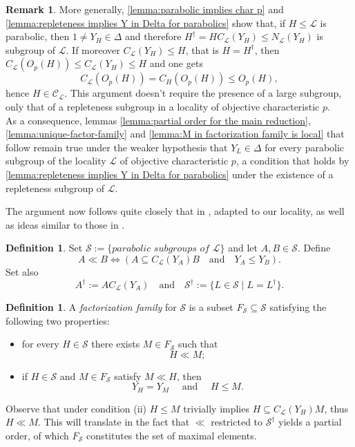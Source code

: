 \documentclass{amsart}
\numberwithin{equation}{section}
\theoremstyle{definition}
\newtheorem{definition}[equation]{Definition}
\newtheorem{remark}[equation]{Remark}
\theoremstyle{subresult}
\theoremstyle{caseresult}
\renewcommand{\L}{\mathcal{L}}
\renewcommand{\S}{\mathcal{S}}
\newcommand{\C}{\mathcal{C}}
\newcommand{\<}{\langle}
\renewcommand{\>}{\rangle}
\begin{document}
\begin{remark}
    More generally, \ref{lemma:parabolic implies char p} and \ref{lemma:repleteness implies Y in Delta for parabolics} show that, if $H \le \L$ is parabolic, then $1 \ne Y_H \in \Delta$ and therefore $H^\dagger =HC_\L(Y_H) \le N_\L(Y_H)$ is subgroup of $\L$. If moreover $C_\L(Y_H) \le H$, that is $H=H^\dagger$, then $C_\L(O_p(H)) \le C_\L(Y_H) \le H$ and one gets
    \[
    C_\L(O_p(H)) = C_H(O_p(H)) \le O_p(H),
    \]
    hence $H \in \C_\L$. This argument doesn't require the presence of a large subgroup, only that of a repleteness subgroup in a locality of objective characteristic $p$.\\    
    As a consequence, lemmas \ref{lemma:partial order for the main reduction}, \ref{lemma:unique-factor-family} and \ref{lemma:M in factorization family is local} that follow remain true under the weaker hypothesis that $Y_L \in \Delta$ for every parabolic subgroup of the locality $\L$ of objective characteristic $p$, a condition that holds by \ref{lemma:repleteness implies Y in Delta for parabolics} under the existence of a repleteness subgroup of $\L$.
\end{remark}

The argument now follows quite closely that in \cite[Section 3]{MS:2009}, adapted to our locality, as well as ideas similar to those in \cite[Lemmas 1.25 and 1.56]{Meier-Stell-Stroth:2012}.



\begin{definition}
	Set $\S := \{ \textit{parabolic subgroups of $\L$} \}$ and let $A,B \in \S$. Define
	\[
	A \ll B \iff \left( A \subseteq C_\L(Y_A)B \quad \text{and} \quad Y_A \le Y_B \right).
	\]
	Set also
	\[
	A^\dagger := AC_\L(Y_A) \quad \text{and} \quad \S^\dagger := \{ L \in \S \mid L = L^\dagger\}.
	\]
\end{definition}

\begin{definition}\label{def:factoriz-family}
A \emph{factorization family} for $\S$ is a subset $F_\S \subseteq \S$ satisfying the following two properties:
\begin{itemize}
	\item[(i)] for every $H \in \S$ there exists $M \in F_\S$ such that
	\[
	H \ll M;
	\]
	\item[(ii)] if $H \in \S$ and $M \in F_\S$ satisfy $M \ll H$, then
	\[
	Y_H = Y_M \quad \text{ and } \quad H \le M.
	\]
	\end{itemize}
\end{definition}
Observe that under condition (ii) $H \le M$ trivially implies $H \subseteq C_\L(Y_H)M$, thus $H \ll M$. This will translate in the fact that $\ll$ restricted to $\S^\dagger$ yields a partial order, of which $F_\S$ constitutes the set of maximal elements.
\end{document}
